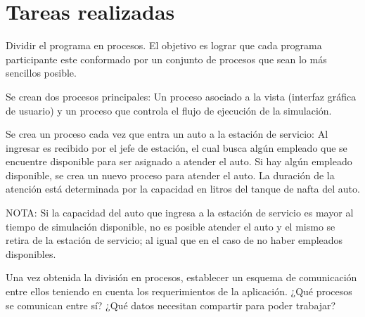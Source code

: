 \documentclass[12pt,a4paper,titlepage,oneside]{article}
\renewenvironment{itemize}{
 \begin{list}{}{
  \setlength{\leftmargin}{1.5em}
 }
}{
 \end{list}
}
\begin{document}
  

\section{Tareas realizadas}

\begin{enumerate}
\item Dividir el programa en procesos. El objetivo es lograr que cada programa participante este conformado por un conjunto de procesos que sean lo más sencillos posible.

\begin{itemize}
\item[•] Se crean dos procesos principales: Un proceso asociado a la vista (interfaz gráfica de usuario) y un proceso que controla el flujo de ejecución de la simulación.
\item[•] Se crea un proceso cada vez que entra un auto a la estación de servicio: Al ingresar es recibido por el jefe de estación, el cual busca algún empleado que se encuentre disponible para ser asignado a atender el auto. Si hay algún empleado disponible, se crea un nuevo proceso para atender el auto. La duración de la atención está determinada por la capacidad en litros del tanque de nafta del auto.
\end{itemize}

NOTA: Si la capacidad del auto que ingresa a la estación de servicio es mayor al tiempo de simulación disponible, no es posible atender el auto y el mismo se retira de la estación de servicio; al igual que en el caso de no haber empleados disponibles.

\item Una vez obtenida la división en procesos, establecer un esquema de comunicación entre ellos teniendo en cuenta los requerimientos de la aplicación. ¿Qué procesos se comunican entre sí? ¿Qué datos necesitan compartir para poder trabajar?


\end{enumerate}
\end{document}
